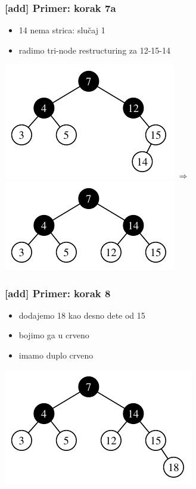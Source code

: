 \documentclass[compress]{beamer}
\begin{document}
\begin{frame}[fragile]
  \frametitle{[add] Primer: korak 7a}
  \begin{itemize}
    \item 14 nema strica: slučaj 1
    \item radimo tri-node restructuring za 12-15-14
  \end{itemize}
  \begin{center}
    \includegraphics[scale=1.0]{asp-11-add-09.pdf} $\Rightarrow$
    \includegraphics[scale=1.0]{asp-11-add-10.pdf}
  \end{center}
\end{frame}

\begin{frame}[fragile]
  \frametitle{[add] Primer: korak 8}
  \begin{itemize}
    \item dodajemo 18 kao desno dete od 15
    \item bojimo ga u crveno
    \item imamo duplo crveno
  \end{itemize}
  \begin{center}
    \includegraphics[scale=0.8]{asp-11-add-11.pdf}
  \end{center}
\end{frame}
\end{document}
